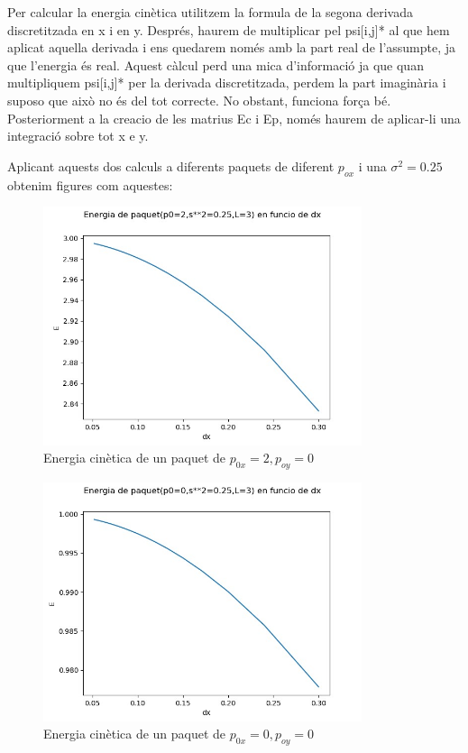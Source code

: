 \documentclass{article}
\begin{document}
Per calcular la energia cinètica utilitzem la formula de la segona derivada discretitzada en x i en y. Després, haurem de multiplicar pel psi[i,j]* al que hem aplicat aquella derivada i ens quedarem només amb la part real de l'assumpte, ja que l'energia és real. Aquest càlcul perd una mica d'informació ja que quan multipliquem psi[i,j]* per la derivada discretitzada, perdem la part imaginària i suposo que això no és del tot correcte. No obstant, funciona força bé. Posteriorment a la creacio de les matrius Ec i Ep, només haurem de aplicar-li una integració sobre tot x e y. 

Aplicant aquests dos calculs a diferents paquets de diferent \(p_{ox}\) i una \(\sigma^2=0.25\) obtenim figures com aquestes:

\begin{figure}[H]
	\includegraphics[width=\textwidth,height=7cm]{problemaenergia4.jpg}
	\caption{Energia cinètica de un paquet de \(p_{0x}=2,p_{oy}=0\)}
\end{figure}
\begin{figure}[H]
	\includegraphics[width=\textwidth,height=7cm]{problemaenergia5.jpg}
	\caption{Energia cinètica de un paquet de \(p_{0x}=0,p_{oy}=0\)}
\end{figure}
\end{document}
